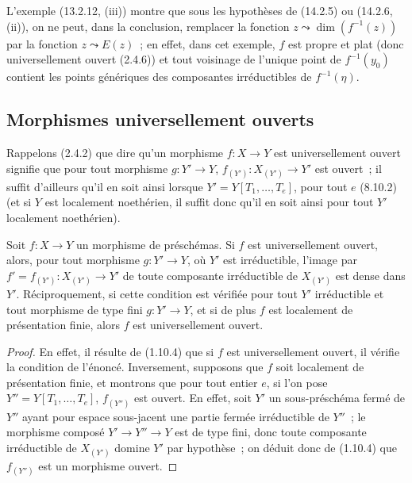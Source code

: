\begin{remark}[14.2.7]
\label{IV.14.2.7-fr}
L'exemple (13.2.12, (iii)) montre que sous les hypothèses de (14.2.5) ou
(14.2.6, (ii)), on ne peut, dans la conclusion, remplacer la fonction
$z\leadsto\dim(f^{-1}(z))$ par la fonction $z\leadsto E(z)$~; en effet, dans cet
exemple, $f$ est propre et plat (donc universellement ouvert (2.4.6)) et tout
voisinage de l'unique point de $f^{-1}(y_0)$ contient les points génériques des
composantes irréductibles de $f^{-1}(\eta)$.
\end{remark}

\subsection{Morphismes universellement ouverts}
\label{subsection:IV.14.3-fr}

\begin{env}[14.3.1]
\label{IV.14.3.1-fr}
Rappelons (2.4.2) que dire qu'un morphisme $f:X\to Y$ est universellement ouvert
signifie que pour tout morphisme $g:Y'\to Y$, $f_{(Y')}:X_{(Y')}\to Y'$ est
ouvert~; il suffit d'ailleurs qu'il en soit ainsi lorsque
$Y'=Y[T_1,\ldots,T_e]$, pour tout $e$ (8.10.2) (et si $Y$ est localement
noethérien, il suffit donc qu'il en soit ainsi pour tout $Y'$ localement
noethérien).
\end{env}

\begin{proposition}[14.3.2]
\label{IV.14.3.2-fr}
Soit $f:X\to Y$ un morphisme de préschémas. Si $f$ est universellement ouvert,
alors, pour tout morphisme $g:Y'\to Y$, où $Y'$ est irréductible, l'image par
$f'=f_{(Y')}:X_{(Y')}\to Y'$ de toute composante irréductible de $X_{(Y')}$ est
dense dans $Y'$. Réciproquement, si cette condition est vérifiée pour tout $Y'$
irréductible et tout morphisme de type fini $g:Y'\to Y$, et si de plus $f$ est
localement de présentation finie, alors $f$ est universellement ouvert.
\end{proposition}

\begin{proof}
En effet, il résulte de (1.10.4) que si $f$ est universellement ouvert, il vérifie
la condition de l'énoncé. Inversement, supposons que $f$ soit localement de
présentation finie, et montrons que pour tout entier $e$, si l'on pose
$Y''=Y[T_1,\ldots,T_e]$, $f_{(Y'')}$ est ouvert. En effet, soit $Y'$ un
sous-préschéma fermé de $Y''$ ayant pour espace sous-jacent une partie fermée
irréductible de $Y''$~; le morphisme composé $Y'\to Y''\to Y$ est de type fini,
donc toute composante irréductible de $X_{(Y')}$ domine $Y'$ par hypothèse~; on
déduit donc de (1.10.4) que $f_{(Y'')}$ est un morphisme ouvert.
\end{proof}

